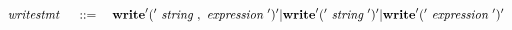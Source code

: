\[
	~\emph{writestmt}~ \quad ::= \quad
		\textbf{write} '(' ~\emph{string}~ , ~\emph{expression}~ ')' |
			\textbf{write} '(' ~\emph{string}~ ')' |
				\textbf{write} '(' ~\emph{expression}~')'
\]